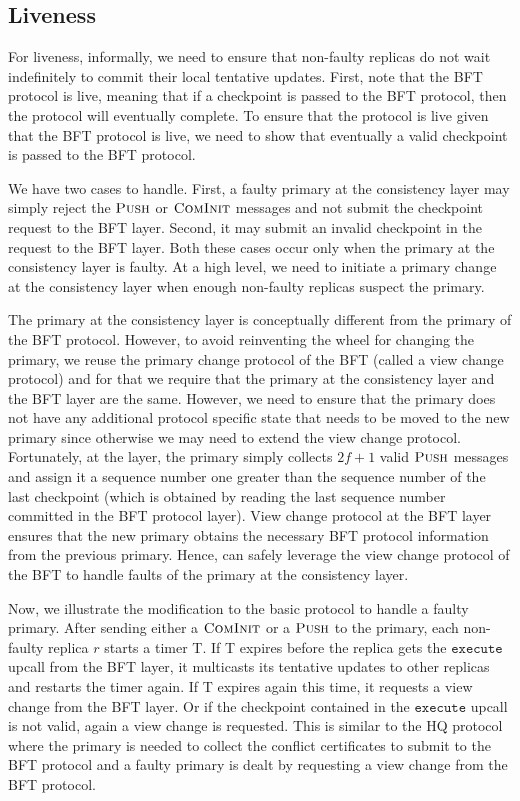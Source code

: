 \documentclass[twocolumn,10pt]{article}
\begin{document}
{\subsection{Liveness}
For liveness, informally, we need to ensure that non-faulty
replicas do not wait indefinitely to commit their local tentative updates. 
First, note that the BFT protocol is live, meaning that if a checkpoint is
passed to the BFT protocol, then the protocol will eventually complete. To ensure
that the \Sys protocol is live given that the BFT protocol is live, we need to show 
that eventually a valid checkpoint is passed to the BFT protocol.

We have two cases to handle. First, a faulty primary at the consistency layer may 
simply reject the $\textsc{Push}$ or $\textsc{ComInit}$ messages and not submit the checkpoint request
to the BFT layer. Second, it may submit an invalid checkpoint in the 
request to the BFT layer. Both these cases occur only when the primary at the 
consistency layer is faulty. At a high level, we need to initiate a primary change
at the consistency layer when enough non-faulty replicas suspect the primary.

The primary at the consistency layer is conceptually different from the primary of the
BFT protocol. However, to avoid reinventing the wheel for changing the primary, we reuse the
primary change protocol of the BFT (called a view change protocol) and for that we require that the primary at 
the consistency layer and the BFT layer are the same. However, we need to ensure that
the primary does not have any additional \Sys protocol specific state that needs to be moved to the new
primary since otherwise we may need to extend the view change protocol. 
Fortunately, at the \Sys layer, the primary simply
collects $2f+1$ valid $\textsc{Push}$ messages and assign it a 
sequence number one greater than the sequence number of the last checkpoint (which is obtained
by reading the last sequence number committed in the BFT protocol layer). View change protocol at the BFT layer ensures that the
new primary obtains the necessary BFT protocol information from the previous primary. Hence, \Sys 
can safely leverage the view change protocol of the BFT to handle faults of the primary at the consistency
layer.

Now, we illustrate the modification to the basic \Sys protocol to handle a faulty primary.
After sending either a $\textsc{ComInit}$ or a $\textsc{Push}$ to the primary, each 
non-faulty replica $r$ starts a timer T. If T expires before the replica gets the 
$\mathtt{execute}$ upcall from the BFT layer, it multicasts its tentative updates 
to other replicas and restarts the timer again. If T expires again this time, it
requests a view change from the 
BFT layer. Or if the checkpoint contained in the $\mathtt{execute}$ upcall is not
valid, again a view change is requested. This is similar to the HQ protocol where
the primary is needed to collect the conflict certificates to submit to the BFT protocol
and a faulty primary is dealt by requesting a view change from the BFT protocol.

}
\end{document}
